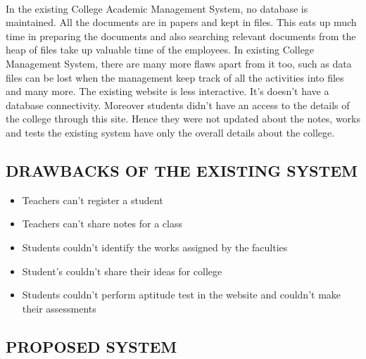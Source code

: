 \documentclass[a4paper, 12pt]{report}
\begin{document}
\paragraph{}In the existing College Academic Management System, no database is maintained. All the documents are in papers and kept in files. This eats up much time in preparing the documents and also searching relevant documents from the heap of files take up valuable time of the employees. In existing College Management System, there are many more flaws apart from it too, such as data files can be lost when the management keep track of all the activities into files and many more. The existing  website is less interactive. It's doesn't have a database connectivity. Moreover students didn't have an access to the details of the college through this site. Hence they were not updated about the notes, works and tests the existing system have only the overall details about the college.
\subsection{DRAWBACKS OF THE EXISTING SYSTEM}
\begin{itemize}
\item Teachers can't register a student
\item Teachers can't share notes for a class
\item Students couldn't identify the works assigned by the faculties
\item Student's couldn't share their ideas for college
\item Students couldn't  perform aptitude test in the website and couldn't make their assessments
\end{itemize}
\subsection{PROPOSED SYSTEM}
\end{document}
